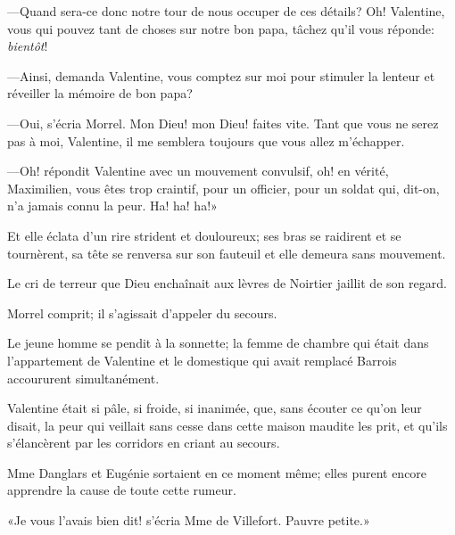 —Quand sera-ce donc notre tour de nous occuper de ces détails? Oh! Valentine, vous qui pouvez tant de choses sur notre bon papa, tâchez qu'il vous réponde: \textit{bientôt}! 

—Ainsi, demanda Valentine, vous comptez sur moi pour stimuler la lenteur et réveiller la mémoire de bon papa? 

—Oui, s'écria Morrel. Mon Dieu! mon Dieu! faites vite. Tant que vous ne serez pas à moi, Valentine, il me semblera toujours que vous allez m'échapper. 

—Oh! répondit Valentine avec un mouvement convulsif, oh! en vérité, Maximilien, vous êtes trop craintif, pour un officier, pour un soldat qui, dit-on, n'a jamais connu la peur. Ha! ha! ha!» 

Et elle éclata d'un rire strident et douloureux; ses bras se raidirent et se tournèrent, sa tête se renversa sur son fauteuil et elle demeura sans mouvement. 

Le cri de terreur que Dieu enchaînait aux lèvres de Noirtier jaillit de son regard. 

Morrel comprit; il s'agissait d'appeler du secours. 

Le jeune homme se pendit à la sonnette; la femme de chambre qui était dans l'appartement de Valentine et le domestique qui avait remplacé Barrois accoururent simultanément. 

Valentine était si pâle, si froide, si inanimée, que, sans écouter ce qu'on leur disait, la peur qui veillait sans cesse dans cette maison maudite les prit, et qu'ils s'élancèrent par les corridors en criant au secours. 

Mme Danglars et Eugénie sortaient en ce moment même; elles purent encore apprendre la cause de toute cette rumeur. 

«Je vous l'avais bien dit! s'écria Mme de Villefort. Pauvre petite.» 